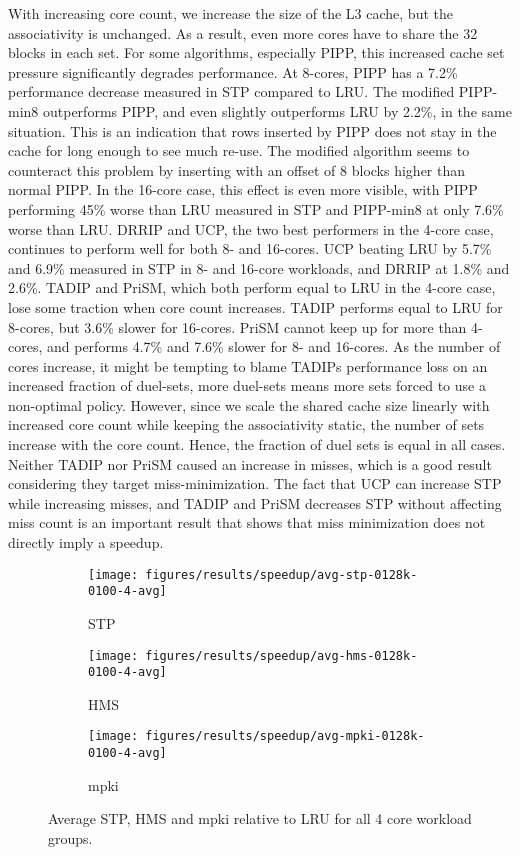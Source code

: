 With increasing core count, we increase the size of the L3 cache, but the associativity is unchanged.
As a result, even more cores have to share the 32 blocks in each set.
For some algorithms, especially PIPP, this increased cache set pressure significantly degrades performance.
At 8-cores, PIPP has a 7.2\% performance decrease measured in STP compared to LRU.
The modified PIPP-min8 outperforms PIPP, and even slightly outperforms LRU by 2.2\%, in the same situation.
This is an indication that rows inserted by PIPP does not stay in the cache for long enough to see much re-use.
The modified algorithm seems to counteract this problem by inserting with an offset of 8 blocks higher than normal PIPP.
In the 16-core case, this effect is even more visible, with PIPP performing 45\% worse than LRU measured in STP and PIPP-min8 at only 7.6\% worse than LRU.
DRRIP and UCP, the two best performers in the 4-core case, continues to perform well for both 8- and 16-cores.
UCP beating LRU by 5.7\% and 6.9\% measured in STP in 8- and 16-core workloads, and DRRIP at 1.8\% and 2.6\%.
TADIP and PriSM, which both perform equal to LRU in the 4-core case, lose some traction when core count increases.
TADIP performs equal to LRU for 8-cores, but 3.6\% slower for 16-cores.
PriSM cannot keep up for more than 4-cores, and performs 4.7\% and 7.6\% slower for 8- and 16-cores.
As the number of cores increase, it might be tempting to blame TADIPs performance loss on an increased fraction of duel-sets, more duel-sets means more sets forced to use a non-optimal policy.
However, since we scale the shared cache size linearly with increased core count while keeping the associativity static, the number of sets increase with the core count.
Hence, the fraction of duel sets is equal in all cases.
Neither TADIP nor PriSM caused an increase in misses, which is a good result considering they target miss-minimization.
The fact that UCP can increase STP while increasing misses, and TADIP and PriSM decreases STP without affecting miss count is an important result that shows that miss minimization does not directly imply a speedup.

\begin{figure}
    \centering
    \begin{subfigure}[b]{0.6\textwidth}
        \texttt{[image: figures/results/speedup/avg-stp-0128k-0100-4-avg]}
        \caption{STP}
        \label{fig:results:base:4-avg:stp}
    \end{subfigure}
    \begin{subfigure}[b]{0.6\textwidth}
        \texttt{[image: figures/results/speedup/avg-hms-0128k-0100-4-avg]}
        \caption{HMS}
        \label{fig:results:base:4-avg:hms}
    \end{subfigure}
    \begin{subfigure}[b]{0.6\textwidth}
        \texttt{[image: figures/results/speedup/avg-mpki-0128k-0100-4-avg]}
        \caption{mpki}
        \label{fig:results:base:4-avg:mpki}
    \end{subfigure}
    \caption{Average STP, HMS and mpki relative to LRU for all 4 core workload groups.}
    \label{fig:results:base:4-avg} 
\end{figure}

